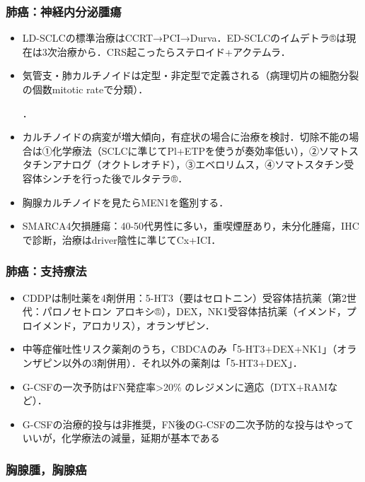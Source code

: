 \subsubsection{肺癌：神経内分泌腫瘍}

\begin{itemize}
\item LD-SCLCの標準治療はCCRT→PCI→Durva．ED-SCLCのイムデトラ®は現在は3次治療から．CRS起こったらステロイド+アクテムラ．
\item 気管支・肺カルチノイドは定型・非定型で定義される（病理切片の細胞分裂の個数mitotic rateで分類）．

．

\item カルチノイドの病変が増大傾向，有症状の場合に治療を検討．切除不能の場合は①化学療法（SCLCに準じてPl+ETPを使うが奏効率低い），②ソマトスタチンアナログ（オクトレオチド），③エベロリムス，④ソマトスタチン受容体シンチを行った後でルタテラ®．
\item 胸腺カルチノイドを見たらMEN1を鑑別する．
\item SMARCA4欠損腫瘍：40-50代男性に多い，重喫煙歴あり，未分化腫瘍，IHCで診断，治療はdriver陰性に準じてCx+ICI．
\end{itemize}


\subsubsection{肺癌：支持療法}

\begin{itemize}
\item CDDPは制吐薬を4剤併用：5-HT3（要はセロトニン）受容体拮抗薬（第2世代：パロノセトロン アロキシ®），DEX，NK1受容体拮抗薬（イメンド，プロイメンド，アロカリス），オランザピン．
\item 中等症催吐性リスク薬剤のうち，CBDCAのみ「5-HT3+DEX+NK1」（オランザピン以外の3剤併用）．それ以外の薬剤は「5-HT3+DEX」．
\item G-CSFの一次予防はFN発症率>20\% のレジメンに適応（DTX+RAMなど）．
\item G-CSFの治療的投与は非推奨，FN後のG-CSFの二次予防的な投与はやっていいが，化学療法の減量，延期が基本である
\end{itemize}

\subsubsection{胸腺腫，胸腺癌}

